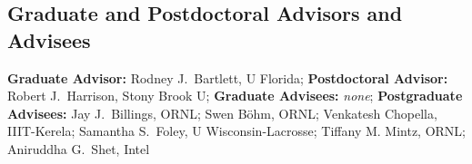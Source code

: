 
\subsection*{Graduate and Postdoctoral Advisors and Advisees}

\textbf{Graduate Advisor:} Rodney J.~Bartlett, U Florida;
\textbf{Postdoctoral Advisor:} Robert J.~Harrison, Stony Brook U; 
\textbf{Graduate Advisees:} \emph{none};
\textbf{Postgraduate Advisees:} 
Jay J.~Billings, ORNL; 
Swen B\"{o}hm, ORNL;
Venkatesh Chopella, IIIT-Kerela; 
Samantha S.~Foley, U Wisconsin-Lacrosse;
Tiffany M. Mintz, ORNL; 
Aniruddha G.~Shet, Intel
